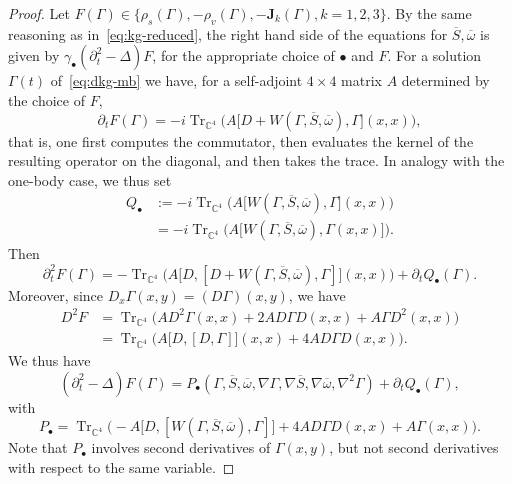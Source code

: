 \documentclass[AHL,Unicode,longabstracts,published]{cedram}
\DeclareMathOperator{\tr}{Tr}
\newcommand\C{\mathbb{C}}
\begin{document}
\begin{proof}
Let $F(\Gamma)\in \{\rho_s(\Gamma),- \rho_v(\Gamma), -{\bm J}_k(\Gamma), k=1,2, 3\}$. By the same reasoning as in~\eqref{eq:kg-reduced}, the right hand side of the equations for $\overline{S}, \overline{\omega}$ is given by $\gamma_\bullet (\partial_t^2 - \Delta)F$, for the appropriate choice of $\bullet$ and $F$. For a solution $\Gamma(t)$ of~\eqref{eq:dkg-mb} we have, for a self-adjoint $4\times 4$ matrix $A$ determined by the choice of $F$,
\begin{equation}
\partial_t F(\Gamma) = -i\tr_{\C^4}\Big(A \big[D +W(\Gamma, \overline{S}, \overline{\omega}), \Gamma\big](x,x) \Big),
\end{equation}
that is, one first computes the commutator, then evaluates the kernel of the resulting operator on the diagonal, and then takes the trace. In analogy with the one-body case, we thus set
\begin{equation}\label{eq:Q-mb-def}
\begin{split}
Q_\bullet &{:=} -i\tr_{\C^4}\Big(A \big[W(\Gamma, \overline{S}, \overline{\omega}), \Gamma\big](x,x) \Big)\\
&{=} -i\tr_{\C^4}\Big(A \big[W(\Gamma, \overline{S}, \overline{\omega}), \Gamma(x,x)\big] \Big).
\end{split}
\end{equation}
Then
\begin{equation}
\partial_t^2 F(\Gamma)= -\tr_{\C^4}\Big(A \big[D,[D +W(\Gamma, \overline{S}, \overline{\omega}), \Gamma]\big](x,x) \Big) + \partial_t Q_\bullet(\Gamma).
\end{equation}
Moreover, since $D_x \Gamma(x,y)= (D\Gamma)(x,y)$, we have
\begin{equation}
\begin{split}
D^2 F &= \tr_{\C^4}\Big(A D^2\Gamma(x,x) + 2 A D \Gamma D(x,x) + A \Gamma D^2 (x,x) \Big)\\
&=\tr_{\C^4}\Big(A \big[D,[D, \Gamma]\big](x,x) +4 A D \Gamma D(x,x)\Big).
\end{split}
\end{equation}
We thus have
\begin{equation}
\left(\partial_t^2 -\Delta\right)F(\Gamma)= P_\bullet\left(\Gamma, \overline{S}, \overline{\omega}, \nabla\Gamma, \nabla \overline{S}, \nabla \overline{\omega},\nabla^2 \Gamma\right) +\partial_t Q_\bullet(\Gamma),
\end{equation}
with
\begin{equation}
P_\bullet=\tr_{\C^4}\Big(-A \big[D,[W(\Gamma, \overline{S}, \overline{\omega}), \Gamma]\big]+4 A D \Gamma D(x,x) + A\Gamma(x,x) \Big).
\end{equation}
Note that $P_\bullet$ involves second derivatives of $\Gamma(x,y)$, but not second derivatives with respect to the same variable.


\end{proof}
\end{document}
